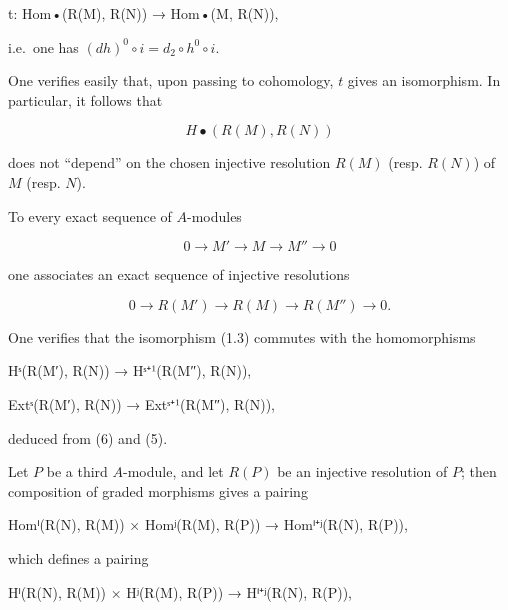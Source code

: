 \documentclass[
]{article}
\newenvironment{Shaded}{}{}
\newcommand{\NormalTok}[1]{#1}
\begin{document}
\begin{Shaded}
\begin{Highlighting}[]
\NormalTok{t: Hom•(R(M), R(N)) → Hom•(M, R(N)),}
\end{Highlighting}
\end{Shaded}

i.e.~one has \((dh)^{0} \circ i = d_{2} \circ h^{0} \circ i\).

One verifies easily that, upon passing to cohomology, \(t\) gives an
isomorphism. In particular, it follows that

\[
H\bullet(R(M), R(N))
\]

does not ``depend'' on the chosen injective resolution \(R(M)\) (resp.
\(R(N)\)) of \(M\) (resp. \(N\)).

To every exact sequence of \(A\)-modules

\[
0 \to M' \to M \to M'' \to 0
\]

one associates an exact sequence of injective resolutions

\[
0 \to R(M') \to R(M) \to R(M'') \to 0.
\]

One verifies that the isomorphism (1.3) commutes with the homomorphisms

\begin{Shaded}
\begin{Highlighting}[]
\NormalTok{Hˢ(R(M′), R(N)) → Hˢ⁺¹(R(M″), R(N)),}
\end{Highlighting}
\end{Shaded}

\begin{Shaded}
\begin{Highlighting}[]
\NormalTok{Extˢ(R(M′), R(N)) → Extˢ⁺¹(R(M″), R(N)),}
\end{Highlighting}
\end{Shaded}

deduced from (6) and (5).

Let \(P\) be a third \(A\)-module, and let \(R(P)\) be an injective
resolution of \(P\); then composition of graded morphisms gives a
pairing

\begin{Shaded}
\begin{Highlighting}[]
\NormalTok{Homⁱ(R(N), R(M)) × Homʲ(R(M), R(P)) → Homⁱ⁺ʲ(R(N), R(P)),}
\end{Highlighting}
\end{Shaded}

which defines a pairing

\begin{Shaded}
\begin{Highlighting}[]
\NormalTok{Hⁱ(R(N), R(M)) × Hʲ(R(M), R(P)) → Hⁱ⁺ʲ(R(N), R(P)),}
\end{Highlighting}
\end{Shaded}
\end{document}
